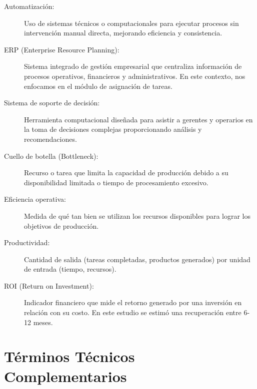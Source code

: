 \begin{description}
    \item[Automatización:] Uso de sistemas técnicos o computacionales para ejecutar procesos sin intervención manual directa, mejorando eficiencia y consistencia.
    
    \item[ERP (Enterprise Resource Planning):] Sistema integrado de gestión empresarial que centraliza información de procesos operativos, financieros y administrativos. En este contexto, nos enfocamos en el módulo de asignación de tareas.
    
    \item[Sistema de soporte de decisión:] Herramienta computacional diseñada para asistir a gerentes y operarios en la toma de decisiones complejas proporcionando análisis y recomendaciones.
    
    \item[Cuello de botella (Bottleneck):] Recurso o tarea que limita la capacidad de producción debido a su disponibilidad limitada o tiempo de procesamiento excesivo.
    
    \item[Eficiencia operativa:] Medida de qué tan bien se utilizan los recursos disponibles para lograr los objetivos de producción.
    
    \item[Productividad:] Cantidad de salida (tareas completadas, productos generados) por unidad de entrada (tiempo, recursos).
    
    \item[ROI (Return on Investment):] Indicador financiero que mide el retorno generado por una inversión en relación con su costo. En este estudio se estimó una recuperación entre 6-12 meses.
\end{description}

\section*{Términos Técnicos Complementarios}

